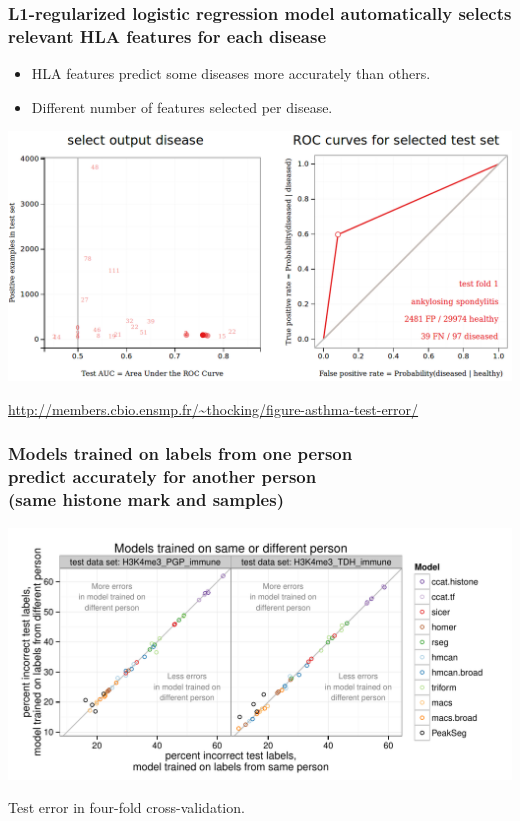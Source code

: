 \documentclass{beamer}
\begin{document}
\begin{frame}
  \frametitle{L1-regularized logistic regression model automatically selects relevant HLA features for each
    disease}

  \begin{itemize}
  \item HLA features predict some diseases more accurately than others.
  \item Different number of features selected per disease.
  \end{itemize}
  \includegraphics[width=\textwidth]{screenshot-ankylosing-spondylitis}

\scriptsize  \url{http://members.cbio.ensmp.fr/~thocking/figure-asthma-test-error/}
\end{frame}

\begin{frame}
  \frametitle{Models trained on labels from one person\\
predict accurately for another person\\
    (same histone mark and samples)}
  \includegraphics[width=1.1\textwidth]{figure-test-H3K4me3-annotators.pdf}

  Test error in four-fold cross-validation.
\end{frame}
\end{document}

